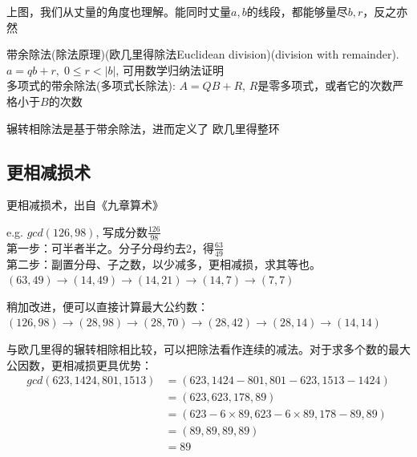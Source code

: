 \documentclass[../main.tex]{subfiles}
\begin{document}

上图，我们从丈量的角度也理解。能同时丈量$a,b$的线段，都能够量尽$b,r$，反之亦然

带余除法(除法原理)(欧几里得除法Euclidean division)(division with remainder). $a=qb+r, \; 0\le r <|b|$, 可用数学归纳法证明\\
多项式的带余除法(多项式长除法): $A=QB+R$, $R$是零多项式，或者它的次数严格小于$B$的次数

辗转相除法是基于带余除法，进而定义了 欧几里得整环
\subsection{更相减损术}
更相减损术，出自《九章算术》

e.g. $gcd(126, 98)$, 写成分数$\frac{126}{98}$\\
第一步：可半者半之。分子分母约去2，得$\frac{63}{49}$\\
第二步：副置分母、子之数，以少减多，更相减损，求其等也。\\
$(63,49) \rightarrow (14, 49)\rightarrow (14,21) \rightarrow (14,7) \rightarrow (7,7)$

稍加改进，便可以直接计算最大公约数：\\
$(126, 98) \rightarrow (28,98) \rightarrow (28,70)\rightarrow (28,42) \rightarrow (28,14) \rightarrow (14,14)$

与欧几里得的辗转相除相比较，可以把除法看作连续的减法。对于求多个数的最大公因数，更相减损更具优势：
\begin{align*}
  gcd(623, 1424, 801, 1513) &= (623, 1424-801, 801-623, 1513-1424)\\
                            &=(623, 623, 178, 89)\\
                            &= (623-6\times 89, 623 -6\times 89, 178-89, 89)\\
                            &=(89, 89, 89, 89)\\
                            &=89\\
\end{align*}
\end{document}
